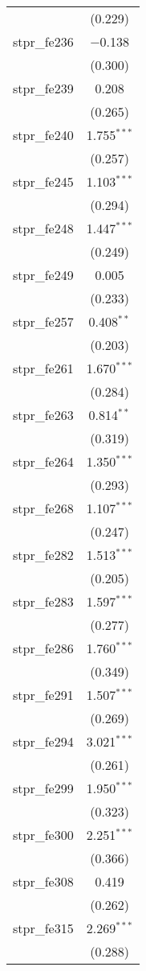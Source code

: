 \begin{table}[!htbp]
\begin{tabular}{@{\extracolsep{5pt}}lc}
  & (0.229) \\ 
  stpr\_fe236 & $-$0.138 \\ 
  & (0.300) \\ 
  stpr\_fe239 & 0.208 \\ 
  & (0.265) \\ 
  stpr\_fe240 & 1.755$^{***}$ \\ 
  & (0.257) \\ 
  stpr\_fe245 & 1.103$^{***}$ \\ 
  & (0.294) \\ 
  stpr\_fe248 & 1.447$^{***}$ \\ 
  & (0.249) \\ 
  stpr\_fe249 & 0.005 \\ 
  & (0.233) \\ 
  stpr\_fe257 & 0.408$^{**}$ \\ 
  & (0.203) \\ 
  stpr\_fe261 & 1.670$^{***}$ \\ 
  & (0.284) \\ 
  stpr\_fe263 & 0.814$^{**}$ \\ 
  & (0.319) \\ 
  stpr\_fe264 & 1.350$^{***}$ \\ 
  & (0.293) \\ 
  stpr\_fe268 & 1.107$^{***}$ \\ 
  & (0.247) \\ 
  stpr\_fe282 & 1.513$^{***}$ \\ 
  & (0.205) \\ 
  stpr\_fe283 & 1.597$^{***}$ \\ 
  & (0.277) \\ 
  stpr\_fe286 & 1.760$^{***}$ \\ 
  & (0.349) \\ 
  stpr\_fe291 & 1.507$^{***}$ \\ 
  & (0.269) \\ 
  stpr\_fe294 & 3.021$^{***}$ \\ 
  & (0.261) \\ 
  stpr\_fe299 & 1.950$^{***}$ \\ 
  & (0.323) \\ 
  stpr\_fe300 & 2.251$^{***}$ \\ 
  & (0.366) \\ 
  stpr\_fe308 & 0.419 \\ 
  & (0.262) \\ 
  stpr\_fe315 & 2.269$^{***}$ \\ 
  & (0.288) \\ 

\end{tabular}
\end{table}
